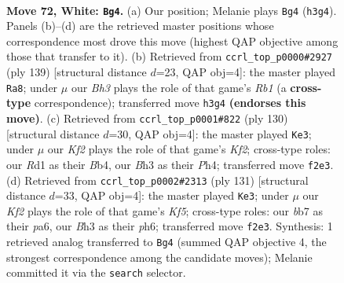 \documentclass[11pt]{article}
\begin{document}
\clearpage

\begin{figure}[p]\centering
\begin{subfigure}{0.46\textwidth}\centering
\resizebox{\linewidth}{!}{%
\newchessgame
\chessboard[
  setfen={8/PbN3k1/8/n7/1p3P2/6PB/5K1P/3R4 w - - 12 72},
  showmover=false,
  pgfstyle=straightmove, color=movearrow, markmove={h3-g4}
]}
\caption{}
\end{subfigure}\hfill
\begin{subfigure}{0.46\textwidth}\centering
\resizebox{\linewidth}{!}{%
\newchessgame
\chessboard[
  setfen={1r6/8/P5pk/3p3p/K2B4/8/4N3/8 b - - 0 70},
  showmover=false,
  pgfstyle=straightmove, color=movearrow, markmove={b8-a8}
]}
\caption{}
\end{subfigure}
\\[4pt]
\begin{subfigure}{0.46\textwidth}\centering
\resizebox{\linewidth}{!}{%
\newchessgame
\chessboard[
  setfen={2R5/3r1bpk/5p2/8/1B5P/5P2/5KP1/8 w - - 19 66},
  showmover=false,
  pgfstyle=straightmove, color=movearrow, markmove={f2-e3}
]}
\caption{}
\end{subfigure}\hfill
\begin{subfigure}{0.46\textwidth}\centering
\resizebox{\linewidth}{!}{%
\newchessgame
\chessboard[
  setfen={8/7p/P2K3P/1P6/3b1k2/6p1/5pB1/8 b - - 11 66},
  showmover=false,
  pgfstyle=straightmove, color=movearrow, markmove={f4-e3}
]}
\caption{}
\end{subfigure}
\caption{\textbf{Move 72, White: \texttt{Bg4}.} (a) Our position; Melanie plays \texttt{Bg4} (\texttt{h3g4}). Panels (b)--(d) are the retrieved master positions whose correspondence most drove this move (highest QAP objective among those that transfer to it). (b) Retrieved from \texttt{ccrl\_top\_p0000\#2927} (ply 139) [structural distance $d$=23, QAP obj=4]: the master played \texttt{Ra8}; under $\mu$ our \emph{Bh3} plays the role of that game's \emph{Rb1} (a \textbf{cross-type} correspondence); transferred move \texttt{h3g4} \textbf{(endorses this move)}. (c) Retrieved from \texttt{ccrl\_top\_p0001\#822} (ply 130) [structural distance $d$=30, QAP obj=4]: the master played \texttt{Ke3}; under $\mu$ our \emph{Kf2} plays the role of that game's \emph{Kf2}; cross-type roles: our \emph{R}d1 as their \emph{B}b4, our \emph{B}h3 as their \emph{P}h4; transferred move \texttt{f2e3}. (d) Retrieved from \texttt{ccrl\_top\_p0002\#2313} (ply 131) [structural distance $d$=33, QAP obj=4]: the master played \texttt{Ke3}; under $\mu$ our \emph{Kf2} plays the role of that game's \emph{Kf5}; cross-type roles: our \emph{b}b7 as their \emph{p}a6, our \emph{B}h3 as their \emph{p}h6; transferred move \texttt{f2e3}. Synthesis: 1 retrieved analog transferred to \texttt{Bg4} (summed QAP objective 4, the strongest correspondence among the candidate moves); Melanie committed it via the \texttt{search} selector.}
\label{fig:thought-m142}
\end{figure}
\end{document}
